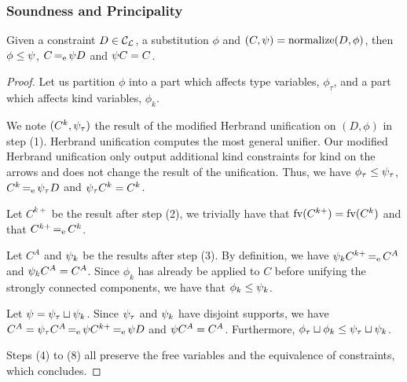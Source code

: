 
\subsubsection{Soundness and Principality}

\begin{lemma}
  \label{lemma:normalform}
  Given a constraint $D\in{\mathcal C_{\mathcal L}}$, a substitution $\phi$ and
  $(C,\mathrm{\psi}) = \operatorname{normalize}(D,\phi)$,
  then $\phi\leq\mathrm{\psi}$,
  $C \operatorname{=_e} \mathrm{\psi} D$ and
  $\mathrm{\psi} C = C$.
\end{lemma}
\begin{proof}
  Let us partition $\phi$ into a part which affects type variables,
  $\phi_\tau$, and a part which affects kind variables, $\phi_k$.
  
  We note $(C^k,\mathrm{\psi}_\tau)$ the result of
  the modified Herbrand unification on $(D,\phi)$ in step (1).
  Herbrand unification computes the most general
  unifier. Our modified Herbrand unification only output additional
  kind constraints for kind on the arrows and does not change
  the result of the unification. Thus, we have
  $\phi_\tau\leq\mathrm{\psi}_\tau$,
  $C^k \operatorname{=_e} \mathrm{\psi}_\tau D$ and
  $\mathrm{\psi}_\tau C^k = C^k$.
  
  Let $C^{k+}$ be the result after step (2), we trivially have that
  $\operatorname{fv}(C^{k+}) = \operatorname{fv}(C^k)$ and that $C^{k+} \operatorname{=_e} C^k$.

  Let $C^{A}$ and $\mathrm{\psi}_k$ be the results after step (3).
  By definition, we have $\mathrm{\psi}_k C^{k+} \operatorname{=_e} C^{A}$ and
  $\mathrm{\psi}_k C^{A} = C^{A}$. Since $\phi_k$ has already be applied to $C$ before
  unifying the strongly connected components,
  we have that $\phi_k\leq\mathrm{\psi}_k$.

  Let $\mathrm{\psi} = \mathrm{\psi}_\tau \sqcup \mathrm{\psi}_k$. Since $\mathrm{\psi}_\tau$ and $\mathrm{\psi}_k$
  have disjoint supports,
  we have $C^{A} = \mathrm{\psi}_\tau C^{A} \operatorname{=_e} \mathrm{\psi} C^{k+} \operatorname{=_e} \mathrm{\psi} D$
  and $\mathrm{\psi} C^{A} = C^{A}$.
  Furthermore, $\phi_\tau \sqcup \phi_k \leq \mathrm{\psi}_\tau \sqcup \mathrm{\psi}_k$.
  
  Steps (4) to (8) all preserve the free variables and the equivalence
  of constraints, which concludes.
\end{proof}

